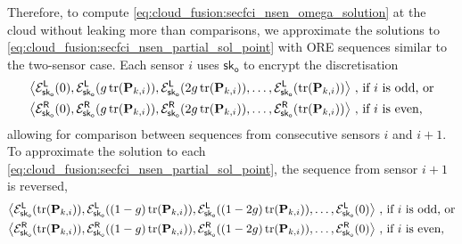 Therefore, to compute \eqref{eq:cloud_fusion:secfci_nsen_omega_solution} at the cloud without leaking more than comparisons, we approximate the solutions to \eqref{eq:cloud_fusion:secfci_nsen_partial_sol_point} with ORE sequences similar to the two-sensor case. Each sensor $i$ uses $\mathsf{sk}_{\mathsf{o}}$ to encrypt the discretisation 
\begin{equation}\label{eq:cloud_fusion:secfci_nsen_enc_seqs}
    \begin{split}
        \left\langle\mathcal{E}^{\mathsf{L}}_{\mathsf{sk}_{\mathsf{o}}}(0), \mathcal{E}^{\mathsf{L}}_{\mathsf{sk}_{\mathsf{o}}}(g\tr(\mat{P}_{k,i})), \mathcal{E}^{\mathsf{L}}_{\mathsf{sk}_{\mathsf{o}}}(2g\tr(\mat{P}_{k,i})),\dots,\mathcal{E}^{\mathsf{L}}_{\mathsf{sk}_{\mathsf{o}}}(\tr(\mat{P}_{k,i}))\right\rangle\,,\ & \text{if } i \text{ is odd, or}\\
        \left\langle\mathcal{E}^{\mathsf{R}}_{\mathsf{sk}_{\mathsf{o}}}(0), \mathcal{E}^{\mathsf{R}}_{\mathsf{sk}_{\mathsf{o}}}(g\tr(\mat{P}_{k,i})), \mathcal{E}^{\mathsf{R}}_{\mathsf{sk}_{\mathsf{o}}}(2g\tr(\mat{P}_{k,i})),\dots,\mathcal{E}^{\mathsf{R}}_{\mathsf{sk}_{\mathsf{o}}}(\tr(\mat{P}_{k,i}))\right\rangle\,,\ & \text{if } i \text{ is even,}
    \end{split}
\end{equation}
allowing for comparison between sequences from consecutive sensors $i$ and $i+1$. To approximate the solution to each \eqref{eq:cloud_fusion:secfci_nsen_partial_sol_point}, the sequence from sensor $i+1$ is reversed,
\begin{equation}\label{eq:cloud_fusion:secfci_nsen_enc_seqs_reversed}
    \begin{split}
        \left\langle\mathcal{E}^{\mathsf{L}}_{\mathsf{sk}_{\mathsf{o}}}(\tr(\mat{P}_{k,i})),\mathcal{E}^{\mathsf{L}}_{\mathsf{sk}_{\mathsf{o}}}((1-g)\tr(\mat{P}_{k,i})), \mathcal{E}^{\mathsf{L}}_{\mathsf{sk}_{\mathsf{o}}}((1-2g)\tr(\mat{P}_{k,i})),\dots,\mathcal{E}^{\mathsf{L}}_{\mathsf{sk}_{\mathsf{o}}}(0)\right\rangle\,,\ & \text{if } i \text{ is odd, or}\\
        \left\langle\mathcal{E}^{\mathsf{R}}_{\mathsf{sk}_{\mathsf{o}}}(\tr(\mat{P}_{k,i})), \mathcal{E}^{\mathsf{R}}_{\mathsf{sk}_{\mathsf{o}}}((1-g)\tr(\mat{P}_{k,i})), \mathcal{E}^{\mathsf{R}}_{\mathsf{sk}_{\mathsf{o}}}((1-2g)\tr(\mat{P}_{k,i})),\dots,\mathcal{E}^{\mathsf{R}}_{\mathsf{sk}_{\mathsf{o}}}(0)\right\rangle\,,\ & \text{if } i \text{ is even,}
    \end{split}
\end{equation}
